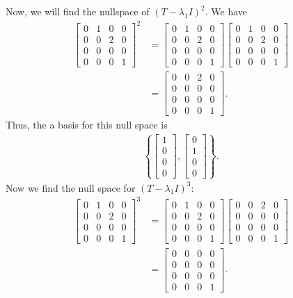 \documentclass[10pt,a4paper]{article}
\theoremstyle{definition}
\begin{document}
Now, we will find the nullspace of $(T - \lambda_1 I)^2$. We have
\begin{align*}
\begin{bmatrix}
0 &1 &0 &0\\
0 &0 &2 &0\\
0 &0 &0 &0\\
0 &0 &0 &1
\end{bmatrix}^2 &= \begin{bmatrix}
0 &1 &0 &0\\
0 &0 &2 &0\\
0 &0 &0 &0\\
0 &0 &0 &1
\end{bmatrix} \begin{bmatrix}
0 &1 &0 &0\\
0 &0 &2 &0\\
0 &0 &0 &0\\
0 &0 &0 &1
\end{bmatrix}\\
&= \begin{bmatrix}
0 &0 &2 &0\\
0 &0 &0 &0\\
0 &0 &0 &0\\
0 &0 &0 &1
\end{bmatrix}.
\end{align*}
Thus, the a basis for this null space is 
\begin{align*}
\left\{\begin{bmatrix}
1\\
0\\
0\\
0
\end{bmatrix}, \begin{bmatrix}
0\\
1\\
0\\
0
\end{bmatrix} \right\}.
\end{align*}
Now we find the null space for $(T - \lambda_1 I)^3$:
\begin{align*}
\begin{bmatrix}
0 &1 &0 &0\\
0 &0 &2 &0\\
0 &0 &0 &0\\
0 &0 &0 &1
\end{bmatrix}^3 &= \begin{bmatrix}
0 &1 &0 &0\\
0 &0 &2 &0\\
0 &0 &0 &0\\
0 &0 &0 &1
\end{bmatrix} \begin{bmatrix}
0 &0 &2 &0\\
0 &0 &0 &0\\
0 &0 &0 &0\\
0 &0 &0 &1
\end{bmatrix}\\
&= \begin{bmatrix}
0 &0 &0 &0\\
0 &0 &0 &0\\
0 &0 &0 &0\\
0 &0 &0 &1
\end{bmatrix}.
\end{align*}
\end{document}
